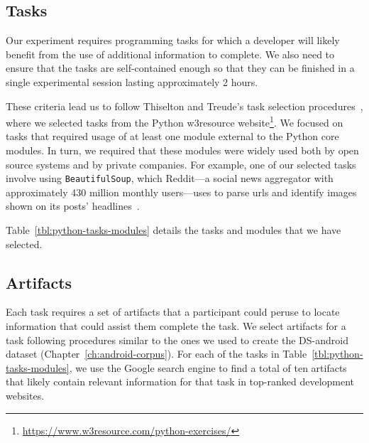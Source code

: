 {\subsection{Tasks}
\label{sec:experiment-tasks}

Our experiment requires programming tasks for which a developer will likely benefit from the use of additional information to complete. We also need to ensure that the tasks are self-contained enough so that they can be finished in a single experimental session lasting approximately 2 hours.


These criteria lead us to 
follow Thiselton and Treude's task selection procedures~\cite{thiselton2019}, 
where we selected tasks from the Python w3resource website\footnote{\url{https://www.w3resource.com/python-exercises/}}.
We focused on tasks that required usage of at least one module external to the Python core modules.
In turn, we required that these modules were widely used both by open source systems and by private companies.
For example, one of our selected tasks involve using \texttt{BeautifulSoup},
which Reddit---a social news aggregator with approximately 430 million monthly users---uses 
to parse urls and identify images shown on its posts' headlines~\cite{bs4-reddit}. 





Table~\ref{tbl:python-tasks-modules} details the tasks and modules that we have selected. 













\clearpage




\subsection{Artifacts}
\label{sec:experiment-artifacts}


Each task requires a set of artifacts that a participant could peruse to locate information that could assist them complete the task.
We select artifacts for a task following procedures similar to the ones we used to create the \acs{DS-android} dataset (Chapter~\ref{ch:android-corpus}). 
For each of the tasks in Table~\ref{tbl:python-tasks-modules}, we use the Google search engine to find a total of ten artifacts that likely contain relevant
information for that task in top-ranked development websites. 






}
